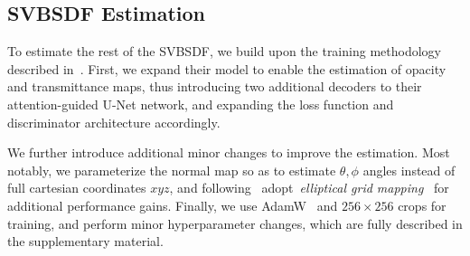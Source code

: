 \subsection{\textbf{SVBSDF Estimation}}
\label{sec:svbsdf_estimation}

To estimate the rest of the SVBSDF, we build upon the training methodology described in~\cite{rodriguezpardo2023UMat}. First, we expand their model to enable the estimation of opacity and transmittance maps, thus introducing two additional decoders to their attention-guided U-Net network, and expanding the loss function and discriminator architecture accordingly. 

We further introduce additional minor changes to improve the estimation. Most notably, we parameterize the normal map so as to estimate $\theta, \phi$ angles instead of full cartesian coordinates $xyz$, and following~\cite{garces2023towards} adopt~\emph{elliptical grid mapping}~\cite{fong2015analytical} for additional performance gains. %
Finally, we use AdamW~\cite{loshchilov2017decoupled} and $256\times256$ crops for training, and perform minor hyperparameter changes, which are fully described in the supplementary material.   



